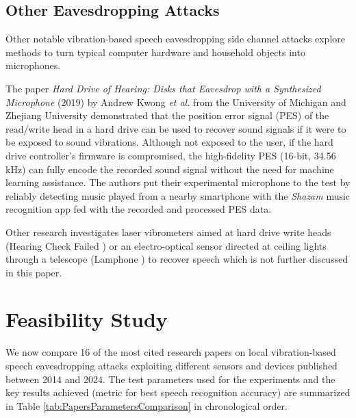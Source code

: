 \documentclass[sigconf, nonacm]{acmart}
\begin{document}
\subsection{Other Eavesdropping Attacks}

Other notable vibration-based speech eavesdropping side channel attacks explore methods to turn typical computer hardware and household objects into microphones.

The paper \textit{Hard Drive of Hearing: Disks that Eavesdrop with a Synthesized Microphone} (2019) \cite{HardDriveOfHearing2019} by Andrew Kwong \textit{et al.} from the University of Michigan and Zhejiang University demonstrated that the position error signal (PES) of the read/write head in a hard drive can be used to recover sound signals if it were to be exposed to sound vibrations. Although not exposed to the user, if the hard drive controller's firmware is compromised, the high-fidelity PES (16-bit, 34.56 kHz) can fully encode the recorded sound signal without the need for machine learning assistance. The authors put their experimental microphone to the test by reliably detecting music played from a nearby smartphone with the \textit{Shazam} music recognition app fed with the recorded and processed PES data.

Other research investigates laser vibrometers aimed at hard drive write heads (Hearing Check Failed \cite{HearingCheckFailed2022}) or an electro-optical sensor directed at ceiling lights through a telescope (Lamphone \cite{Lamphone2022}) to recover speech which is not further discussed in this paper.

\section{Feasibility Study}
We now compare 16 of the most cited research papers on local vibration-based speech eavesdropping attacks exploiting different sensors and devices published between 2014 and 2024.
The test parameters used for the experiments and the key results achieved (metric for best speech recognition accuracy) are summarized in Table \ref{tab:PapersParametersComparison} in chronological order.
\end{document}
